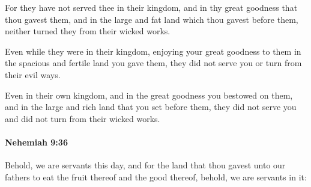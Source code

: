 			\begin{versebox}
					\item[BHS] 
					\item[LXX] 
					\item[ASV] For they have not served thee in their kingdom, and in thy great goodness that thou gavest them, and in the large and fat land which thou gavest before them, neither turned they from their wicked works.
					\item[NIV] Even while they were in their kingdom, enjoying your great goodness to them in the spacious and fertile land you gave them, they did not serve you or turn from their evil ways.
					\item[NRSV] Even in their own kingdom, and in the great goodness you bestowed on them, and in the large and rich land that you set before them, they did not serve you and did not turn from their wicked works.
			\end{versebox}

		\paragraph{Nehemiah 9:36} %
			\label{NEHEMIAH-9-36}

			Behold, we are servants this day, and for the land that thou gavest unto our fathers to eat the fruit thereof and the good thereof, behold, we are servants in it:

